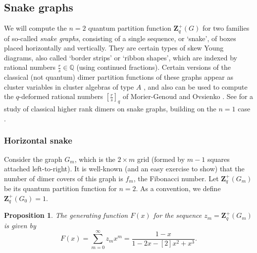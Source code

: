\documentclass[12pt, reqno]{amsart}
\newtheorem{prop}[theo]{Proposition}
\theoremstyle{definition}
\newcommand{\Zq}{\mathbf{Z}_q}%
\begin{document}
\subsection{Snake graphs}

We will compute the $n=2$ quantum partition function $\Zq^+(G)$ for two families of so-called \emph{snake graphs}, consisting of a single sequence, or `snake', of boxes placed horizontally and vertically. They are certain types of skew Young diagrams, also called `border strips' or `ribbon shapes', which are indexed by rational numbers $\frac{r}{s} \in \mathbb{Q}$ (using continued fractions).  Certain versions of the classical (not quantum) dimer partition functions of these graphs  appear as cluster variables in cluster algebras of type $A$ \cite{msw_13}, and also can be used to compute the $q$-deformed rational numbers $\left[ \frac{r}{s} \right]_q$ of Morier-Genoud and Ovsienko \cite{mgo_20}.  See \cite{mosz_23} for a study of classical higher rank dimers on snake graphs, building on the $n=1$ case \cite{cs_18}.  

\subsubsection {Horizontal snake}

Consider the graph $G_m$, which is the $2 \times m$ grid (formed by $m-1$ squares attached left-to-right).  It is well-known (and an easy exercise to show) that the number of dimer covers of this graph is $f_m$, the Fibonacci number.  Let $\Zq^+(G_m)$ be its quantum partition function for $n=2$. As a convention, we define $\Zq^+(G_0) = 1$. 

\begin{prop}
The generating function $F(x)$ for the sequence $z_m = \Zq^+(G_m)$ is given by
$$ 
F(x) = \sum_{m=0}^\infty z_m x^m = \frac{1-x}{1 - 2x - [2] x^2 + x^3}. 
$$
\end{prop}
\end{document}
